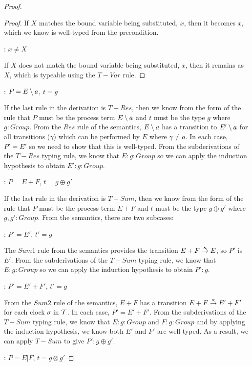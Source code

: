\begin{proof}
\begin{proof}
\noindent If $X$ matches the bound variable being substituted, $x$, then it
becomes $x$, which we know is well-typed from the precondition.
  
: $x \ne X$

\noindent If $X$ does not match the bound variable being substituted, $x$, then it
remains as $X$, which is typeable using the $T-Var$ rule.

\end{proof}

: $P = E \setminus {a}$, $t = g$

\noindent If the last rule in the derivation is $T-Res$, then we know
from the form of the rule that $P$ must be the process term $E
\setminus {a}$ and $t$ must be the type $g$ where $g : Group$.  From the
$Res$ rule of the semantics, $E \setminus {a}$ has a transition to $E'
\setminus {a}$ for all transitions ($\gamma$) which can be performed by $E$
where $\gamma \ne a$.  In each case, $P' = E'$ so we need to show that
this is well-typed.  From the subderivations of the $T-Res$ typing
rule, we know that $E : g : Group$ so we can apply the induction
hypothesis to obtain $E' : g : Group$.

: $P = E + F$, $t = g \oplus g'$

\noindent If the last rule in the derivation is $T-Sum$, then we know
from the form of the rule that $P$ must be the process term $E + F$
and $t$ must be the type $g \oplus g'$ where $g, g' : Group$.  From
the semantics, there are two subcases:

: $P' = E'$, $t' = g$

\noindent The $Sum1$ rule from the semantics provides the transition
$E + F \stackrel{\kappa}{\rightarrow} E$, so $P'$ is $E'$.  From the
subderivations of the $T-Sum$ typing rule, we know that $E : g : Group$
so we can apply the induction hypothesis to obtain $P' : g$.

: $P' = E' + F'$, $t' = g$

\noindent From the $Sum2$ rule of the semantics, $E + F$ has a
transition $E + F \stackrel{\sigma}{\rightarrow} E' + F'$ for each clock $\sigma$ in
$\text{$\mathcal{T}$}$.  In each case, $P' = E' + F'$.  From the subderivations of
the $T-Sum$ typing rule, we know that $E : g : Group$ and $F : g :
Group$ and by applying the induction hypothesis, we know both $E'$ and
$F'$ are well typed.  As a result, we can apply $T-Sum$ to give $P' : g
\oplus g'$.

: $P = E | F$, $t = g \otimes g'$


\end{proof}
